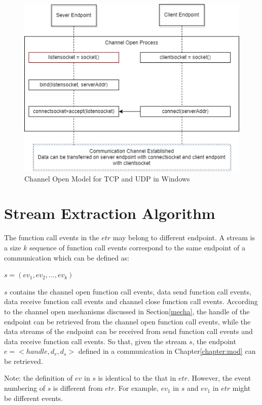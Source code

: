 \begin{figure}[H]
\centerline{\includegraphics[scale=0.45]{Figures/tcpudpchannelopen}}
 \caption{Channel Open Model for TCP and UDP in Windows}
\label{channelopen2}    
\end{figure}

\section{Stream Extraction Algorithm}
The function call events in the $etr$ may belong to different endpoint. A stream is a size $k$ sequence of function call events correspond to the same endpoint of a communication which can be defined as:

$s = (ev_1, ev_2, ..., ev_k)$

$s$ contains the channel open function call events, data send function call events, data receive function call events and channel close function call events. According to the channel open mechanisms discussed in Section\ref{mecha}, the handle of the endpoint can be retrieved from the channel open function call events, while the data streams of the endpoint can be received from send function call events and data receive function call events. So that, given the stream $s$, the endpoint $ e =<handle,  d_r, d_s>$ defined in a communication in Chapter\ref{chapter:mod} can be retrieved.

Note: the definition of $ev$ in $s$ is identical to the that in $etr$. However, the event numbering of $s$ is different from $etr$. For example, $ev_1$ in $s$ and $ev_1$ in $etr$ might be different events.


